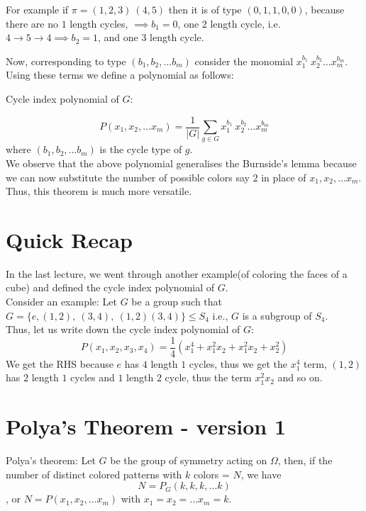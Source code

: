 For example if $\pi = (1, 2, 3)\ (4, 5)$ then it is of type $(0, 1, 1, 0, 0)$, because there are no $1$ length cycles, $\implies b_1 = 0$, one $2$ length cycle, i.e. $4 \rightarrow 5 \rightarrow 4 \implies b_2 = 1$, and one $3$ length cycle.

Now, corresponding to type $(b_1, b_2, \ldots b_m)$ consider the monomial $x_1^{b_1}\ x_2^{b_2} \ldots x_m^{b_m}$. Using these terms we define a polynomial as follows:
\begin{definition}
Cycle index polynomial of $G$:
\end{definition}
$$P(x_1, x_2, \ldots x_m) = \frac{1}{|G|} \sum_{g \in G} x_1^{b_1}\ x_2^{b_2} \ldots x_m^{b_m}$$ where $(b_1, b_2, \ldots b_m)$ is the cycle type of $g$.
\\
We observe that the above polynomial generalises the Burnside's lemma because we can now substitute the number of possible colors say $2$ in place of $x_1, x_2, \ldots x_m$. Thus, this theorem is much more versatile.
\\

\section{Quick Recap}
In the last lecture, we went through another example(of coloring the faces of a cube) and defined the cycle index polynomial of $G$.
\\
Consider an example:
Let $G$ be a group such that $G = \{e, (1, 2),\ (3, 4),\ (1,2)(3,4)\} \le S_4$
i.e., $G$ is a subgroup of $S_4$.
\\
Thus, let us write down the cycle index polynomial of $G$:
$$P(x_1, x_2, x_3, x_4) = \frac{1}{4} (x_1^4 + x_1^2x_2 + x_1^2x_2 + x_2^2)$$
We get the RHS because $e$ has $4$ length $1$ cycles, thus we get the $x_1^4$ term, $(1, 2)$ has $2$ length $1$ cycles and $1$ length $2$ cycle, thus the term $x_1^2x_2$ and so on.

\section{Polya's Theorem - version 1}
\begin{theorem}
Polya's theorem: Let $G$ be the group of symmetry acting on $\Omega$, then, if the number of distinct colored patterns with $k$ colors = $N$, we have
$$N = P_G(k, k, k, \ldots k)$$,
or $N = P(x_1, x_2, \ldots x_m)$ with $x_1 = x_2 = \ldots x_m = k$.
\end{theorem}

